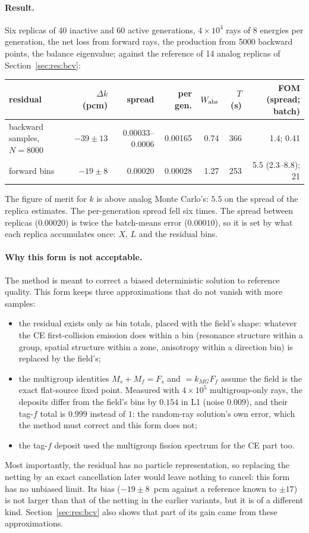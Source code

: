 \paragraph{Result.} Six replicas of 40 inactive and 60 active generations, $4\times10^4$ rays of 8
energies per generation, the net loss from forward rays, the production from 5000 backward points,
the balance eigenvalue; against the reference of 14 analog replicas of Section~\ref{sec:res:bcv}:
\begin{center}\footnotesize\setlength{\tabcolsep}{4pt}
\begin{tabular}{@{}lrrrrrr@{}}
\toprule
residual & $\Delta k$ (pcm) & spread & per gen. & $W_{\mathrm{abs}}$ & $T$ (s) & FOM (spread; batch)\\
\midrule
backward samples, $N=8000$ & $-39\pm13$ & 0.00033--0.0006 & 0.00165 & 0.74 & 366 & 1.4; 0.41\\
forward bins & $-19\pm8$ & 0.00020 & 0.00028 & 1.27 & 253 & 5.5 (2.3--8.8); 21\\
\bottomrule
\end{tabular}
\end{center}
The figure of merit for $k$ is above analog Monte Carlo's: $5.5$ on the spread of the replica
estimates. The per-generation spread fell six times. The spread between replicas ($0.00020$) is twice
the batch-means error ($0.00010$), so it is set by what each replica accumulates once: $X$, $L$ and
the residual bins.

\paragraph{Why this form is not acceptable.} The method is meant to correct a biased deterministic
solution to reference quality. This form keeps three approximations that do not vanish with more
samples:
\begin{itemize}
\item the residual exists only as bin totals, placed with the field's shape: whatever the CE
  first-collision emission does within a bin (resonance structure within a group, spatial structure
  within a zone, anisotropy within a direction bin) is replaced by the field's;
\item the multigroup identities $M_s+M_f=F_s$ and $=k_{MG}F_f$ assume the field is the exact
  flat-source fixed point. Measured with $4\times10^5$ multigroup-only rays, the deposits differ from
  the field's bins by $0.154$ in L1 (noise $0.009$), and their tag-$f$ total is $0.999$ instead of
  $1$: the random-ray solution's own error, which the method must correct and this form does not;
\item the tag-$f$ deposit used the multigroup fission spectrum for the CE part too.
\end{itemize}
Most importantly, the residual has no particle representation, so replacing the netting by an
exact cancellation later would leave nothing to cancel: this form has no unbiased limit. Its bias
($-19\pm8$~pcm against a reference known to $\pm17$) is not larger than that of the netting in the
earlier variants, but it is of a different kind. Section~\ref{sec:res:bcv} also shows that part of
its gain came from these approximations.

